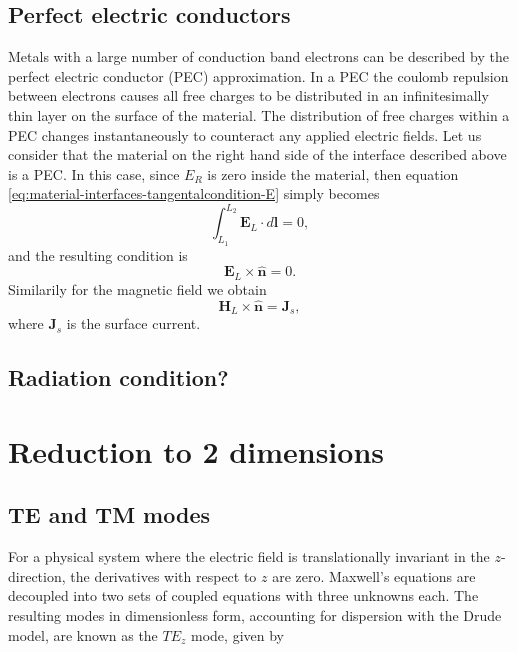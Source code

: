 \subsection{Perfect electric conductors}

Metals with a large number of conduction band electrons can be described by the perfect electric conductor (PEC) approximation. In a PEC the coulomb repulsion between electrons causes all free charges to be distributed in an infinitesimally thin layer on the surface of the material. The distribution of free charges within a PEC changes instantaneously to counteract any applied electric fields. Let us consider that the material on the right hand side of the interface described above is a PEC. In this case, since $E_R$ is zero inside the material, then equation \ref{eq:material-interfaces-tangentalcondition-E} simply becomes
$$
\int_{L_1}^{L_2} \mathbf{E}_L \cdot d\mathbf{l} = 0 ,
$$
and the resulting condition is
$$
\mathbf{E}_L \times \hat{\mathbf{n}} = 0 .
$$
Similarily for the magnetic field we obtain
$$
\mathbf{H}_L \times \hat{\mathbf{n}} = \mathbf{J}_s ,
$$
where $\mathbf{J}_s$ is the surface current.

\subsection{Radiation condition?}

\section{Reduction to 2 dimensions}

\subsection{TE and TM modes}
For a physical system where the electric field is translationally invariant in the $z$-direction, the derivatives with respect to $z$ are zero. Maxwell's equations are decoupled into two sets of coupled equations with three unknowns each. The resulting modes in dimensionless form, accounting for dispersion with the Drude model, are known as the $TE_z$ mode, given by

